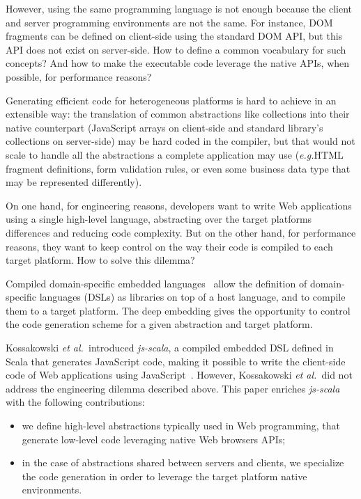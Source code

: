 \documentclass[preprint]{sigplanconf}
\newcommand{\eg}{\emph{e.g.}}
\newcommand{\etal}{\emph{et al.~}}
\begin{document}
However, using the same programming language is not enough because the client and server programming environments
are not the same. For instance, DOM fragments can be defined on client-side using the standard DOM API, but this
API does not exist on server-side. How to define a common vocabulary for such concepts? And how to make the
executable code leverage the native APIs, when possible, for performance reasons?

Generating efficient code for heterogeneous platforms is hard to achieve in an extensible way: the translation of
common abstractions like collections into their native counterpart (JavaScript arrays on client-side and standard
library's collections on server-side) may be hard coded in the compiler, but that would not scale to handle all the
abstractions a complete application may use (\eg HTML fragment definitions, form validation rules, or even some
business data type that may be represented differently).

On one hand, for engineering reasons, developers want to write Web applications using a single high-level language,
abstracting over the target platforms differences and reducing code complexity. But on the other hand, for
performance reasons, they want to keep control on the way their code is compiled to each target platform. How to
solve this dilemma?

Compiled domain-specific embedded languages~\cite{Elliott2003_Compiling} allow the definition of domain-specific
languages (DSLs) as libraries on top of a host language, and to compile them to a target platform. The deep embedding
gives the opportunity to control the code generation scheme for a given abstraction and target platform.

Kossakowski \etal introduced \emph{js-scala}, a compiled embedded DSL defined in Scala that generates JavaScript
code, making it possible to write the client-side code of Web applications using
JavaScript~\cite{Kossakowski12_JsDESL}. However, Kossakowski \etal did not address the engineering dilemma described
above. This paper enriches \emph{js-scala} with the following contributions:

\begin{itemize}
 \item we define high-level abstractions typically used in Web programming, that generate low-level code leveraging
native Web browsers APIs;
 \item in the case of abstractions shared between servers and clients, we specialize the code generation in order to
leverage the target platform native environments.
\end{itemize}
\end{document}
